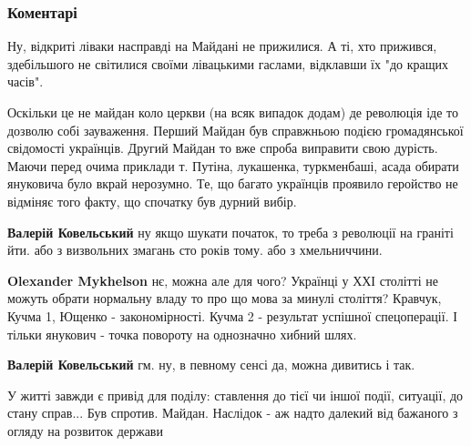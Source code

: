 
 
 
 
 
\subsubsection{Коментарі}

\begin{itemize} %

Ну, відкриті ліваки насправді на Майдані не прижилися. А ті, хто прижився,
здебільшого не світилися своїми лівацькими гаслами, відклавши їх "до кращих
часів".


Оскільки це не майдан коло церкви (на всяк випадок додам) де революція іде то дозволю собі зауваження.
Перший Майдан був справжньою подією громадянської свідомості українців.
Другий Майдан то вже спроба виправити свою дурість. Маючи перед очима приклади т. Путіна, лукашенка, туркменбаші, асада обирати януковича було вкрай нерозумно.
Те, що багато українців проявило геройство не відміняє того факту, що спочатку був дурний вибір.

\begin{itemize} %
\textbf{Валерій Ковельський} ну якщо шукати початок, то треба з революції на граніті йти. або з визвольних змагань сто років тому. або з хмельниччини.

\textbf{Olexander Mykhelson} нє, можна але для чого?
Українці у ХХІ столітті не можуть обрати нормальну владу то про що мова за минулі століття?
Кравчук, Кучма 1, Ющенко - закономірності. Кучма 2 - результат успішної спецоперації.
І тільки янукович - точка повороту на однозначно хибний шлях.

\textbf{Валерій Ковельський} гм. ну, в певному сенсі да, можна дивитись і так.
\end{itemize} %


У житті завжди є привід для поділу: ставлення до тієї чи іншої події, ситуації,
до стану справ... Був спротив. Майдан. Наслідок - аж надто далекий від бажаного
з огляду на розвиток держави



\end{itemize}
